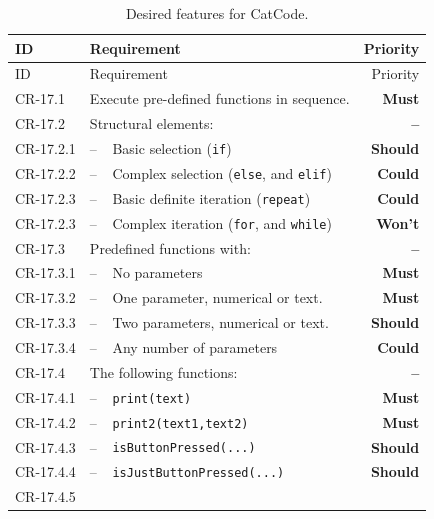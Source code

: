 \begin{center}
  \begin{longtable}{lp{0.5cm}p{7cm}r}
    \caption{Desired features for CatCode.} \label{tab:coreRequirements/catCode-features} \\
    \toprule
    ID
    & \multicolumn{2}{l}{Requirement}
    & Priority \\ \midrule
    \endfirsthead
    \toprule
    ID
    & \multicolumn{2}{l}{Requirement}
    & Priority \\ \midrule
    \endhead
    CR-17.1
    & \multicolumn{2}{l}{Execute pre-defined functions in sequence.}
    & \textbf{Must}
    \\
    CR-17.2
    & \multicolumn{2}{l}{Structural elements:}
    & \textbf{--}
    \\
    CR-17.2.1
    & -- & Basic selection (\texttt{if})
    & \textbf{Should}
    \\
    CR-17.2.2
    & -- & Complex selection (\texttt{else}, and \texttt{elif})
    & \textbf{Could}
    \\
    CR-17.2.3
    & -- & Basic definite iteration (\texttt{repeat})
    & \textbf{Could}
    \\
    CR-17.2.3
    & -- & Complex iteration (\texttt{for}, and \texttt{while})
    & \textbf{Won't}
    \\
    CR-17.3
    & \multicolumn{2}{l}{Predefined functions with:}
    & \textbf{--}
    \\
    CR-17.3.1
    & -- & No parameters
    & \textbf{Must}
    \\
    CR-17.3.2
    & -- & One parameter, numerical or text.
    & \textbf{Must}
    \\
    CR-17.3.3
    & -- & Two parameters, numerical or text.
    & \textbf{Should}
    \\
    CR-17.3.4
    & -- & Any number of parameters
    & \textbf{Could}
    \\
    CR-17.4
    & \multicolumn{2}{l}{The following functions:}
    & \textbf{--}
    \\
    CR-17.4.1
    & -- & \texttt{print(text)}
    & \textbf{Must}
    \\
    CR-17.4.2
    & -- & \texttt{print2(text1,text2)}
    & \textbf{Must}
    \\
    CR-17.4.3
    & -- & \texttt{isButtonPressed(...)}
    & \textbf{Should}
    \\
    CR-17.4.4
    & -- & \texttt{isJustButtonPressed(...)}
    & \textbf{Should}
    \\
    CR-17.4.5

\end{longtable}
\end{center}
